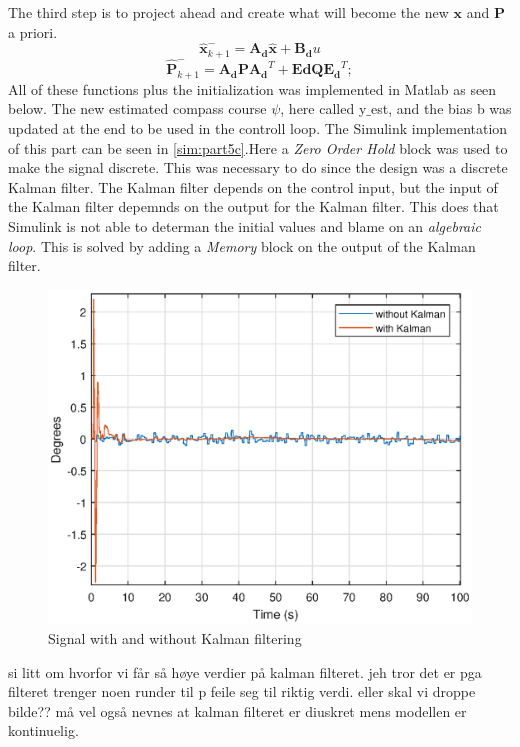 The third step is to project ahead and create what will become the new $\boldsymbol{x}$ and $\boldsymbol{P}$ a priori.
\begin{equation}
    \boldsymbol{\hat{x}}^-_{k+1} = \boldsymbol{A_d}\boldsymbol{\hat{x}} + \boldsymbol{B_d}u
\end{equation}
\begin{equation}
    \boldsymbol{\hat{P}}^-_{k+1} = \boldsymbol{A_d}\boldsymbol{P}\boldsymbol{A_d}^T + \boldsymbol{Ed}\boldsymbol{Q}\boldsymbol{E_d}^T;
\end{equation}
All of these functions plus the initialization was implemented in Matlab as seen below. The new estimated compass course $\psi$, here called y$\_$est, and the bias b was updated at the end to be used in the controll loop. The Simulink implementation of this part can be seen in \ref{sim:part5c}.Here a \textit{Zero Order Hold} block was used to make the signal discrete. This was necessary to do since the design was a discrete Kalman filter. \newline
The Kalman filter depends on the control input, but the input of the Kalman filter depemnds on the output for the Kalman filter. This does that Simulink is not able to determan the initial values and blame on an \textit{algebraic loop}. This is solved by adding a \textit{Memory} block on the output of the Kalman filter.  

\begin{figure}[H]
    \centering
    \includegraphics[width=0.8\linewidth]{Part5_pics/ny_p5c.eps}
    \caption{Signal with and without Kalman filtering }
    \label{fig:p5c}
\end{figure}
si litt om hvorfor vi får så høye verdier på kalman filteret. jeh tror det er pga filteret trenger noen runder til p feile seg til riktig verdi. eller skal vi droppe bilde?? 
må vel også nevnes at kalman filteret er diuskret mens modellen er kontinuelig. 


